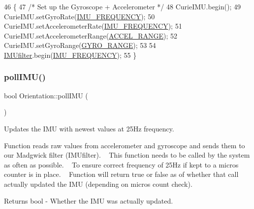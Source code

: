 \begin{DoxyCode}
46 \{
47   \textcolor{comment}{/* Set up the Gyroscope + Accelerometer */}
48   CurieIMU.begin();
49   CurieIMU.setGyroRate(\hyperlink{_orientation_8cpp_aacb21c2e16f8c38c985b8f02787a7baf}{IMU\_FREQUENCY});
50   CurieIMU.setAccelerometerRate(\hyperlink{_orientation_8cpp_aacb21c2e16f8c38c985b8f02787a7baf}{IMU\_FREQUENCY});
51   CurieIMU.setAccelerometerRange(\hyperlink{_orientation_8cpp_a16ec7011dea5773b504e875852f35fc1}{ACCEL\_RANGE});
52   CurieIMU.setGyroRange(\hyperlink{_orientation_8cpp_af9a0775d43604d7410e3da3dbc90925a}{GYRO\_RANGE});
53 
54   \hyperlink{class_logging_device_1_1_orientation_a517282a58a498881d97d57f4829a38d9}{IMUfilter}.begin(\hyperlink{_orientation_8cpp_aacb21c2e16f8c38c985b8f02787a7baf}{IMU\_FREQUENCY});
55 \}
\end{DoxyCode}
\mbox{\label{class_logging_device_1_1_orientation_aad568a473f999c181abac46a4d832387}} 
\subsubsection{\texorpdfstring{poll\+I\+M\+U()}{pollIMU()}}
{\footnotesize\ttfamily bool Orientation\+::poll\+I\+MU (\begin{DoxyParamCaption}{ }\end{DoxyParamCaption})}



Updates the I\+MU with newest values at 25\+Hz frequency. 

Function reads raw values from accelerometer and gyroscope and sends them to our Madgwick filter (I\+M\+Ufilter). ~\newline
This function needs to be called by the system as often as possible. ~\newline
To ensure correct frequency of 25\+Hz if kept to a micros counter is in place. ~\newline
Function will return true or false as of whether that call actually updated the I\+MU (depending on micros count check).

\begin{DoxyReturn}{Returns}
bool -\/ Whether the I\+MU was actually updated. 
\end{DoxyReturn}


